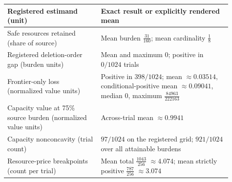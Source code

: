 \begin{tabular}{@{}>{\raggedright\arraybackslash}p{0.38\linewidth}>{\raggedright\arraybackslash}p{0.53\linewidth}@{}}
\toprule
Registered estimand (unit) & Exact result or explicitly rendered mean \\
\midrule
Safe resources retained (share of source) & Mean burden \(\frac{31}{160}\); mean cardinality \(\frac{1}{8}\) \\
Registered deletion-order gap (burden units) & Mean and maximum \(0\); positive in \(0/1024\) trials \\
Frontier-only loss (normalized value units) & Positive in \(398/1024\); mean \(\approx0.03514\), conditional-positive mean \(\approx0.09041\), median \(0\), maximum \(\frac{84963}{222163}\) \\
Capacity value at 75\% source burden (normalized value units) & Across-trial mean \(\approx0.9941\) \\
Capacity nonconcavity (trial count) & \(97/1024\) on the registered grid; \(921/1024\) over all attainable burdens \\
Resource-price breakpoints (count per trial) & Mean total \(\frac{1043}{256}\) \(\approx4.074\); mean strictly positive \(\frac{787}{256}\) \(\approx3.074\) \\
\bottomrule
\end{tabular}
